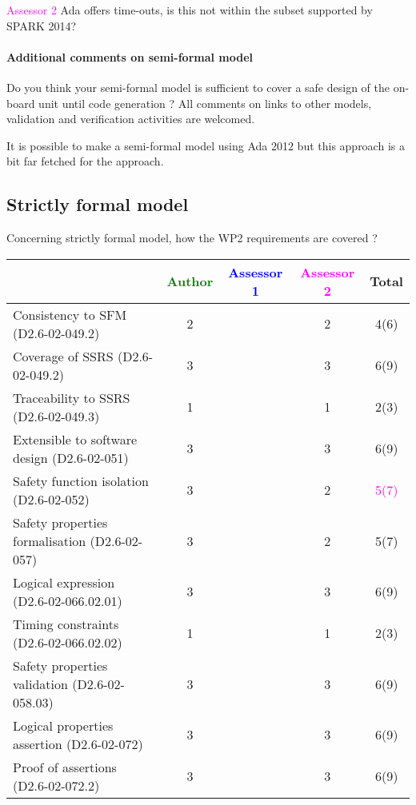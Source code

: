 \textcolor{magenta}{Assessor 2} Ada offers time-outs, is this not within the
subset supported by SPARK 2014?

\paragraph{Additional comments on semi-formal  model} Do you think your semi-formal  model is sufficient to cover a safe design of the on-board unit until code generation ?
All comments on links to  other models, validation and verification activities are welcomed.

It is possible to make a semi-formal model using Ada 2012 but this
approach is a bit far fetched for the approach.

\subsection{Strictly formal model}

Concerning strictly formal model, how the WP2 requirements are covered ?

\begin{tabular}{|l | c | c | c | c|}
\hline
& \textcolor{green}{Author} & \textcolor{blue}{Assessor 1} & \textcolor{magenta}{Assessor 2} & Total \\
\hline 
Consistency to SFM (D2.6-02-049.2) & 2     & & 2     &  4(6) \\
\hline
Coverage of SSRS (D2.6-02-049.2)  & 3     & & 3     &  6(9) \\
\hline
Traceability to  SSRS (D2.6-02-049.3)  & 1     & & 1     &  2(3) \\
\hline
Extensible to software design (D2.6-02-051)  & 3     & & 3     &  6(9) \\
\hline
Safety function isolation (D2.6-02-052)  & 3     & & 2     & \textcolor{magenta}{5(7)}  \\
\hline 
Safety properties formalisation (D2.6-02-057)  & 3     & & 2     &  5(7) \\
\hline
Logical expression (D2.6-02-066.02.01)  & 3     & & 3     &  6(9) \\
\hline
Timing constraints (D2.6-02-066.02.02)  & 1     & & 1     &  2(3) \\
\hline
Safety properties validation (D2.6-02-058.03)  & 3     & & 3     &  6(9) \\
\hline
Logical properties assertion (D2.6-02-072)  & 3     & & 3     &  6(9) \\
\hline
Proof of assertions (D2.6-02-072.2)  & 3     & & 3     &  6(9) \\
\hline
\end{tabular}

